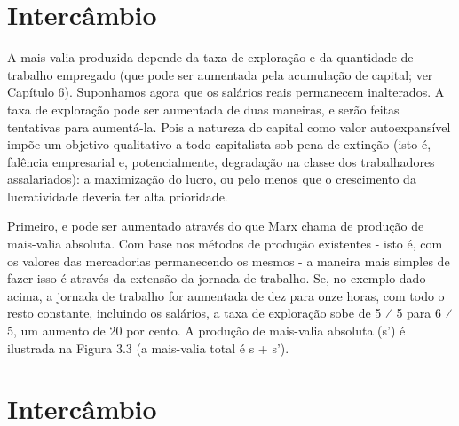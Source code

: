 \section{Intercâmbio}
 \par 
A mais-valia produzida depende da taxa de exploração e da quantidade de trabalho empregado (que pode ser aumentada pela acumulação de capital; ver Capítulo {\color{blue}6}). Suponhamos agora que os salários reais permanecem inalterados. A taxa de exploração pode ser aumentada de duas maneiras, e serão feitas tentativas para aumentá-la. Pois a natureza do capital como valor autoexpansível impõe um objetivo qualitativo a todo capitalista sob pena de extinção (isto é, falência empresarial e, potencialmente, degradação na classe dos trabalhadores assalariados): a maximização do lucro, ou pelo menos que o crescimento da lucratividade deveria ter alta prioridade.
 \par 
Primeiro, e pode ser aumentado através do que Marx chama de produção de mais-valia absoluta. Com base nos métodos de produção existentes - isto é, com os valores das mercadorias permanecendo os mesmos - a maneira mais simples de fazer isso é através da extensão da jornada de trabalho. Se, no exemplo dado acima, a jornada de trabalho for aumentada de dez para onze horas, com todo o resto constante, incluindo os salários, a taxa de exploração sobe de {\color{blue}5} ⁄ {\color{blue}5} para {\color{blue}6} ⁄ 5, um aumento de {\color{blue}20} por cento. A produção de mais-valia absoluta (s') é ilustrada na Figura {\color{blue}3}.3 (a mais-valia total é s + s').
 \par 
\section{Intercâmbio}
 \par 
